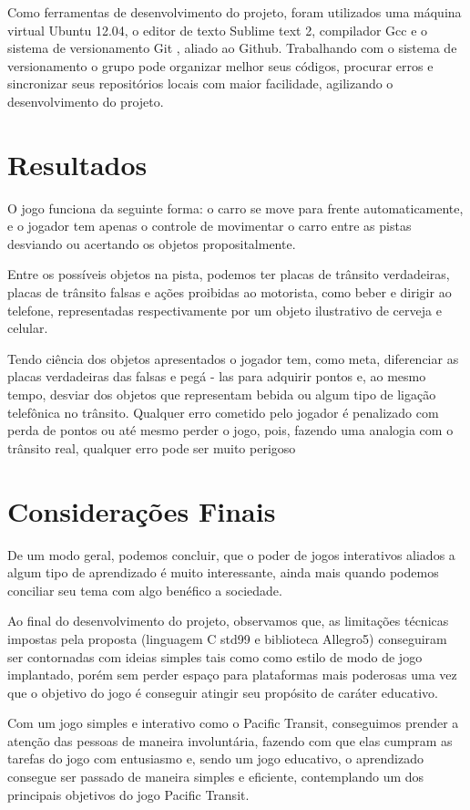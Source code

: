 \documentclass[
	article,			%
	11pt,				%
	oneside,			%
	a4paper,			%
	english,			%
	brazil,				%
	]{abntex2}
\begin{document}
Como ferramentas de desenvolvimento do projeto, foram utilizados uma máquina virtual Ubuntu 12.04, o 
editor de texto Sublime text 2, compilador Gcc e o sistema de versionamento Git , aliado ao Github.
Trabalhando com o sistema de versionamento o grupo pode organizar melhor seus códigos,
procurar erros e sincronizar seus repositórios locais com maior facilidade,
agilizando o desenvolvimento do projeto.

\section{Resultados}

O jogo funciona da seguinte forma: o carro se move para frente automaticamente, 
e o jogador tem apenas o controle de movimentar o carro entre as pistas desviando ou acertando os 
objetos propositalmente.

Entre os possíveis objetos na pista, podemos ter placas de trânsito verdadeiras, placas de trânsito falsas e 
ações proibidas ao motorista, como beber e dirigir ao telefone, representadas respectivamente por um objeto 
ilustrativo de cerveja e celular.

Tendo ciência dos objetos apresentados o jogador tem, como meta, diferenciar as placas verdadeiras das
falsas e pegá - las para adquirir pontos e, ao mesmo tempo, desviar dos objetos que representam bebida 
ou algum tipo de ligação telefônica no trânsito.
Qualquer erro cometido pelo jogador é penalizado com perda de pontos ou até mesmo perder o jogo, pois,
fazendo uma analogia com o trânsito real, qualquer erro pode ser muito perigoso


\section{Considerações Finais}

De um modo geral, podemos concluir, que o poder de jogos interativos aliados a algum 
tipo de aprendizado é muito interessante, ainda mais quando podemos conciliar seu tema com algo 
benéfico a sociedade.

Ao final do desenvolvimento do projeto, observamos que, as limitações técnicas impostas pela
proposta (linguagem C std99 e biblioteca Allegro5) conseguiram ser contornadas com ideias simples tais como 
como estilo de modo de jogo implantado, porém sem perder espaço para plataformas mais poderosas
uma vez que o objetivo do jogo é conseguir atingir seu propósito de caráter educativo.

Com um jogo simples e interativo como o Pacific Transit, conseguimos prender a atenção das pessoas de maneira involuntária,
fazendo com que elas cumpram as tarefas do jogo com entusiasmo e, sendo um jogo educativo, o aprendizado consegue ser  
passado de maneira simples e eficiente, contemplando um dos principais objetivos do jogo Pacific Transit.\\
\\
% 
\end{document}
